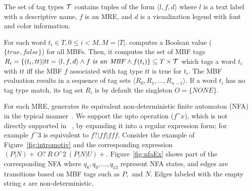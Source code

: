 The set of tag types ${\cal T}$ contains tuples of the form $\langle l,f,d\rangle$ 
where $l$ is a text label with a descriptive name, 
$f$ is an MRE, and $d$ is a visualization legend 
with font and color information.

For each word $t_i\in T, 0\le i < M, M=|T|$.
\framework computes a Boolean value 
($\{\mathit{true}, \mathit{false}\}$)
for all MBFs. 
Then, it computes the set of MBF tags
$R_i=\{(t_i,tt)| tt=\langle l,f,d\rangle \wedge
f~\mathit{is~an~MBF} \wedge f(t_i)\} \subseteq T \times {\cal T}$
which tags a word $t_i$ with $\mathit{tt}$ 
iff the MBF $f$ associated with
tag type $\mathit{tt}$ is true for $t_i$. 
The MBF evaluation results in a sequence of tag sets 
$\langle R_0, R_1, \ldots, R_{n-1}\rangle$.
If a word $t_i$ has no tag type match, 
its tag set $R_i$ is by default the singleton $O=\{\mathit{NONE}\}$.


For each MRE, 
\framework generates its equivalent non-deterministic finite automaton (NFA) in the typical manner~\cite{sipser2006introduction}. 
We support the upto operation ($f$\^{}$x$), which is not directly 
supported in ~\cite{sipser2006introduction}, by 
expanding it into a regular expression form; for example 
$f$\^{}$3$ is equivalent to $f?|ff|fff$. 
Consider the example of Figure~\ref{fig:intromotiv} and the
corresponding expression $(P|N)\!+~O?~R~O^\wedge 2~(P|N|U)+$. 
Figure~\ref{fig:nfaEx} shows part of the corresponding NFA where
$q_8, q_9, \dots, q_{13}$ represent NFA states,
and edges are transitions based on MBF tags such as 
$P,$ and $N$.
Edges labeled with the empty string $\epsilon$ are non-deterministic.

